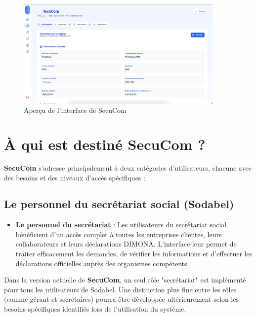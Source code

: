 \begin{figure}[H]
  \centering
  \includegraphics[width=0.9\textwidth]{SecuComPreviewCompany.png}
  \caption{Aperçu de l'interface de SecuCom}
  \label{fig:secucomPreview}
\end{figure}

\section{À qui est destiné SecuCom ?}

\textbf{SecuCom} s'adresse principalement à deux catégories d'utilisateurs, chacune avec des besoins et des niveaux d'accès spécifiques :

\subsection{Le personnel du secrétariat social (Sodabel)}

\begin{itemize}[leftmargin=*,label=\textcolor{darkgray}{$\bullet$},itemsep=0.3em]
  \item \textbf{Le personnel du secrétariat} : Les utilisateurs du secrétariat social bénéficient d'un accès complet à toutes les entreprises clientes, leurs collaborateurs et leurs déclarations DIMONA. L'interface leur permet de traiter efficacement les demandes, de vérifier les informations et d'effectuer les déclarations officielles auprès des organismes compétents.
\end{itemize}

\begin{note}
Dans la version actuelle de \textbf{SecuCom}, un seul rôle "secrétariat" est implémenté pour tous les utilisateurs de Sodabel. Une distinction plus fine entre les rôles (comme gérant et secrétaires) pourra être développée ultérieurement selon les besoins spécifiques identifiés lors de l'utilisation du système.
\end{note}

